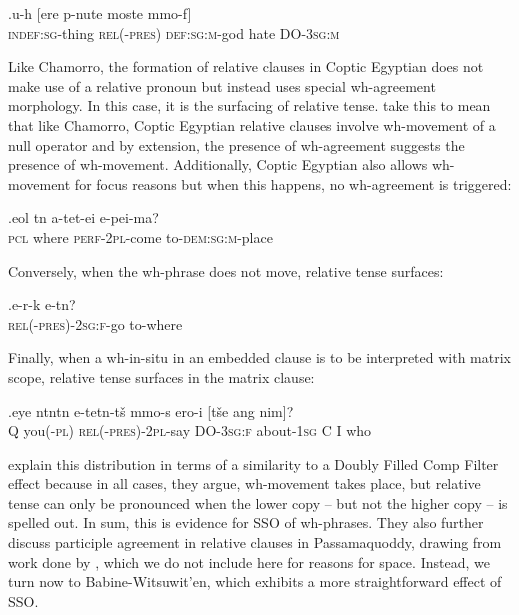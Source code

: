 \documentclass[11pt]{article}
\begin{document}
\exg.\label{wh.150}u-h{\textopeno\textbeta} [ere p-nute moste mmo-f]\\
   \textsc{indef:sg}-thing \textsc{rel(-pres)} \textsc{def:sg:m}-god hate DO-\textsc{3sg:m}\\

Like Chamorro, the formation of relative clauses in Coptic Egyptian does not make use of a relative pronoun but instead uses special wh-agreement morphology. In this case, it is the surfacing of relative tense. \cite{rlc:2006} take this to mean that like Chamorro, Coptic Egyptian relative clauses involve wh-movement of a null operator and by extension, the presence of wh-agreement suggests the presence of wh-movement. Additionally, Coptic Egyptian also allows wh-movement for focus reasons but when this happens, no wh-agreement is triggered:

\exg.\label{wh.160}e{\textbeta}ol t{\textopeno}n a-tet{\textschwa}-ei e-pei-ma?\\
   \textsc{pcl} where \textsc{perf-2pl}-come to-\textsc{dem:sg:m}-place\\

Conversely, when the wh-phrase does not move, relative tense surfaces:

\exg.\label{wh.170}e-r-{\textbeta\textepsilon}k e-t{\textopeno}n?\\
   \textsc{rel(-pres)-2sg:f}-go to-where\\

Finally, when a wh-in-situ in an embedded clause is to be interpreted with matrix scope, relative tense surfaces in the matrix clause:

\exg.\label{wh.180}eye {\textschwa}nt{\textopeno}nt{\textschwa}n e-tet{\textschwa}n-t\v{s}{\textopeno} {\textschwa}mmo-s ero-i [t\v{s}e ang nim]?\\
   Q you(\textsc{-pl}) \textsc{rel(-pres)-2pl}-say DO-\textsc{3sg:f} about-\textsc{1sg} C I who\\

\cite{rlc:2006} explain this distribution in terms of a similarity to a Doubly Filled Comp Filter effect \citep{chomsky-lasnik:77} because in all cases, they argue, wh-movement takes place, but relative tense can only be pronounced when the lower copy -- but not the higher copy -- is spelled out. In sum, this is evidence for SSO of wh-phrases. They also further discuss participle agreement in relative clauses in Passamaquoddy, drawing from work done by \cite{bruening:2001}, which we do not include here for reasons for space. Instead, we turn now to Babine-Witsuwit'en, which exhibits a more straightforward effect of SSO.
\end{document}
